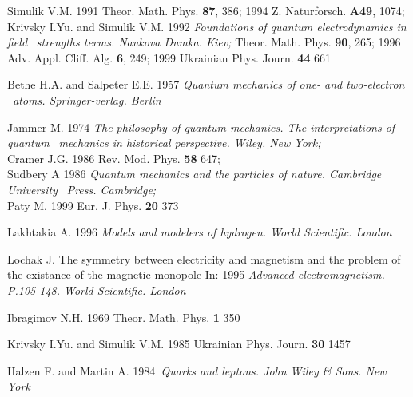 \documentclass[a4paper,12pt]{article}
\begin{document}
\begin{thebibliography}{99}
  Simulik V.M. 1991 Theor. Math. Phys. \textbf{87}, 386; 1994 Z.
Naturforsch. \textbf{A49}, 1074;\\ Krivsky I.Yu. and Simulik V.M. 1992
\textit{Foundations of quantum electrodynamics in field} \textit{\ strengths
terms. Naukova Dumka. Kiev;} Theor. Math. Phys. \textbf{90}, 265; 1996 Adv.
Appl. Cliff. Alg. \textbf{6}, 249; 1999 Ukrainian Phys. Journ. \textbf{44}
661

  Bethe H.A. and Salpeter E.E. 1957 \textit{Quantum mechanics of
one- and two-electron} \textit{\ atoms. Springer-verlag. Berlin}

  Jammer M. 1974 \textit{The philosophy of quantum mechanics.
The interpretations of quantum} \textit{\ mechanics in historical
perspective. Wiley. New York;}\\ Cramer J.G. 1986 Rev. Mod. Phys. \textbf{58}
647;\\ Sudbery A 1986 \textit{Quantum mechanics and the particles of nature.
Cambridge University} \textit{\ Press. Cambridge;}\\ Paty M. 1999 Eur. J.
Phys. \textbf{20} 373

  Lakhtakia A. 1996 \textit{Models and modelers of hydrogen.
World Scientific. London}

  Lochak J. The symmetry between electricity and magnetism
and the problem of the existance of the magnetic monopole In: 1995 \textit{%
Advanced electromagnetism. P.105-148. World Scientific. London}

  Ibragimov N.H. 1969 Theor. Math. Phys. \textbf{1} 350

  Krivsky I.Yu. and Simulik V.M. 1985 Ukrainian Phys. Journ.
\textbf{30} 1457

  Halzen F. and Martin A. 1984\textit{\ Quarks and leptons.
John Wiley \& Sons. New York}
\end{thebibliography}
\end{document}
